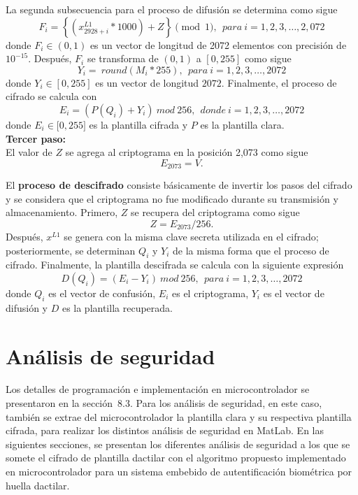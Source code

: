 La segunda subsecuencia para el proceso de difusión se determina como sigue
\begin{equation}
F_{i}=\left\lbrace \left(x_{2928+i}^{L1}\ast 1000\right)+Z\right\rbrace \pmod 1, ~~ para ~i=1,2,3,\ldots ,2,072 
\end{equation}
donde $F_{i}\in \left(0,1\right)$ es un vector de longitud de 2072 elementos con precisión de $10^{-15}$. Después, $F_{i}$ se transforma de $\left(0,1\right)$ a $\left[0,255\right]$ como sigue   
\begin{equation}
Y_{i}=~round\left(M_{i}\ast 255\right), ~~ para ~i=1,2,3,\ldots ,2072
\end{equation}
donde $Y_{i}\in \left[0,255\right]$ es un vector de longitud $2072$. Finalmente, el proceso de cifrado se calcula con
\begin{equation}
E_{i}=\left(P(Q_{i})+Y_{i}\right) ~mod~256, ~~ donde ~i=1,2,3,\ldots ,2072
\end{equation}
donde $E_{i}\in \lbrack 0,255]$ es la plantilla cifrada y $P$ es la plantilla clara. \\ 

\textbf{Tercer paso:}\\

El valor de $Z$ se agrega al criptograma en la posición 2,073 como sigue
\begin{equation}
E_{2073}=V.
\end{equation} 

El \textbf{proceso de descifrado} consiste básicamente de invertir los pasos del cifrado y se considera que el criptograma no fue modificado durante su transmisión y almacenamiento. Primero, $Z$ se recupera del criptograma como sigue
\begin{equation}
Z=E_{2073}/256.
\end{equation}  
Después, $x^{L1}$ se genera con la misma clave secreta utilizada en el cifrado; posteriormente, se determinan $Q_{i}$ y $Y_{i}$ de la misma forma que el proceso de cifrado. Finalmente, la plantilla descifrada se calcula con la siguiente expresión
\begin{equation}
D(Q_{i})=\left(E_{i} - Y_{i}\right) ~mod~ 256, ~~ para ~i=1,2,3,\ldots ,2072
\end{equation} 
donde $Q_{i}$ es el vector de confusión, $E_{i}$ es el criptograma, $Y_{i}$ es el vector de difusión y $D$ es la plantilla recuperada.

\section{Análisis de seguridad}
Los detalles de programación e implementación en microcontrolador se presentaron en la sección~8.3. Para los análisis de seguridad, en este caso, también se extrae del microcontrolador la plantilla clara y su respectiva plantilla cifrada, para realizar los distintos análisis de seguridad en MatLab. En las siguientes secciones, se presentan los diferentes análisis de seguridad a los que se somete el cifrado de plantilla dactilar con el algoritmo propuesto implementado en microcontrolador para un sistema embebido de autentificación biométrica por huella dactilar. 

